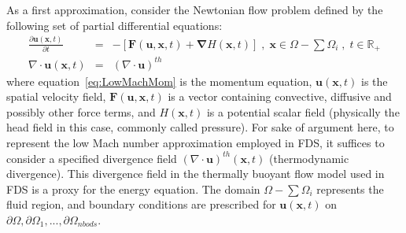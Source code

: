 As a first approximation, consider the Newtonian flow problem defined by the following set of partial differential equations:
%
\begin{eqnarray}
  \frac{\partial \mathbf{u}(\mathbf{x},t)}{\partial t} &=& - \left[ \mathbf{F}(\mathbf{u},\mathbf{x},t) + \boldsymbol{\nabla} H(\mathbf{x},t) \right] \; , \; \mathbf{x} \in \Omega - \sum{\Omega_i} \; , \; t \in \mathbb{R}_+ \label{eq:LowMachMom} \\
         \nabla \cdot \mathbf{u} (\mathbf{x},t) & = & \left(\nabla \cdot \mathbf{u} \right)^{th} \label{eq:LowMachDiv}
\end{eqnarray}
%
where equation~\eqref{eq:LowMachMom} is the momentum equation, $\mathbf{u}(\mathbf{x},t)$ is the spatial velocity field, $\mathbf{F}(\mathbf{u},\mathbf{x},t)$ is a vector containing convective, diffusive and possibly other force terms, and $H(\mathbf{x},t)$ is a potential scalar field (physically the head field in this case, commonly called pressure). For sake of argument here, to represent the low Mach number approximation employed in FDS, it suffices to consider a specified divergence field $\left(\nabla \cdot \mathbf{u} \right)^{th} (\mathbf{x},t)$ (thermodynamic divergence). This divergence field in the thermally buoyant flow model used in FDS is a proxy for the energy equation.
The domain $\Omega - \sum{\Omega_i}$ represents the fluid region, and boundary conditions are prescribed for $\mathbf{u}(\mathbf{x},t)$ on $\partial \Omega,\partial \Omega_1,...,\partial \Omega_{nbods}$.

